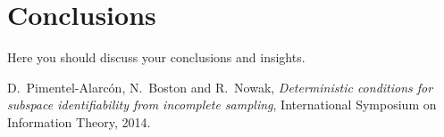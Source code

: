 \documentclass[conference]{IEEEtran}
\begin{document}
\section{Conclusions}
Here you should discuss your conclusions and insights.

\begin{thebibliography}{1}

D.~Pimentel-Alarc\'on, N.~Boston and R.~Nowak, \emph{Deterministic conditions for subspace identifiability from incomplete sampling}, International Symposium on Information Theory, 2014.

\end{thebibliography}
\end{document}
